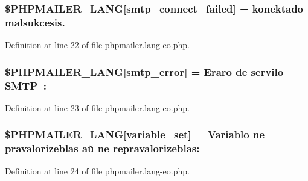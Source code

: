 \subsubsection[{\texorpdfstring{\$\+P\+H\+P\+M\+A\+I\+L\+E\+R\+\_\+\+L\+A\+NG}{$PHPMAILER_LANG}}]{\setlength{\rightskip}{0pt plus 5cm}\$P\+H\+P\+M\+A\+I\+L\+E\+R\+\_\+\+L\+A\+NG\mbox{[}\textquotesingle{}smtp\+\_\+connect\+\_\+failed\textquotesingle{}\mbox{]} =  konektado malsukcesis.\textquotesingle{}}\hypertarget{phpmailer_8lang-eo_8php_a7b321d4ca1e9df702403ed4c61aa0980}{}\label{phpmailer_8lang-eo_8php_a7b321d4ca1e9df702403ed4c61aa0980}


Definition at line 22 of file phpmailer.\+lang-\/eo.\+php.

\subsubsection[{\texorpdfstring{\$\+P\+H\+P\+M\+A\+I\+L\+E\+R\+\_\+\+L\+A\+NG}{$PHPMAILER_LANG}}]{\setlength{\rightskip}{0pt plus 5cm}\$P\+H\+P\+M\+A\+I\+L\+E\+R\+\_\+\+L\+A\+NG\mbox{[}\textquotesingle{}smtp\+\_\+error\textquotesingle{}\mbox{]} = \textquotesingle{}Eraro de servilo S\+M\+T\+P \+: \textquotesingle{}}\hypertarget{phpmailer_8lang-eo_8php_a7d9cffba1e669c845f8a4c891ee50064}{}\label{phpmailer_8lang-eo_8php_a7d9cffba1e669c845f8a4c891ee50064}


Definition at line 23 of file phpmailer.\+lang-\/eo.\+php.

\subsubsection[{\texorpdfstring{\$\+P\+H\+P\+M\+A\+I\+L\+E\+R\+\_\+\+L\+A\+NG}{$PHPMAILER_LANG}}]{\setlength{\rightskip}{0pt plus 5cm}\$P\+H\+P\+M\+A\+I\+L\+E\+R\+\_\+\+L\+A\+NG\mbox{[}\textquotesingle{}variable\+\_\+set\textquotesingle{}\mbox{]} = \textquotesingle{}Variablo ne pravalorizeblas aŭ ne repravalorizeblas\+: \textquotesingle{}}\hypertarget{phpmailer_8lang-eo_8php_af795debc7a739d038742691c358d9032}{}\label{phpmailer_8lang-eo_8php_af795debc7a739d038742691c358d9032}


Definition at line 24 of file phpmailer.\+lang-\/eo.\+php.

